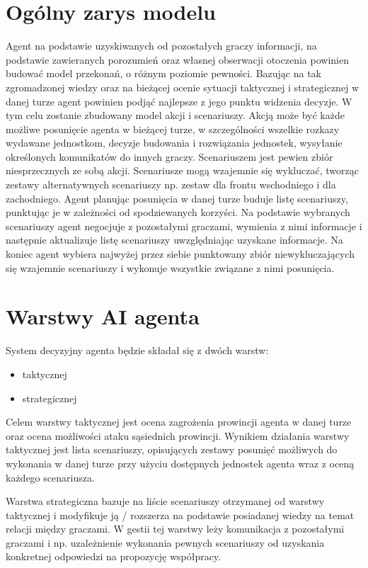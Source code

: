 \section{Ogólny zarys modelu}
Agent na podstawie uzyskiwanych od pozostałych graczy informacji, na podstawie zawieranych porozumień oraz własnej obserwacji otoczenia powinien budować model przekonań, o różnym poziomie pewności. Bazując na tak zgromadzonej wiedzy oraz na bieżącej ocenie sytuacji taktycznej i strategicznej w danej turze agent powinien podjąć najlepsze z jego punktu widzenia decyzje. W tym celu zostanie zbudowany model akcji i scenariuszy. Akcją może być każde możliwe posunięcie agenta w bieżącej turze, w szczególności wszelkie rozkazy wydawane jednostkom, decyzje budowania i rozwiązania jednostek, wysyłanie określonych komunikatów do innych graczy. Scenariuszem jest pewien zbiór niesprzecznych ze sobą akcji. Scenariusze mogą wzajemnie się wykluczać, tworząc zestawy alternatywnych scenariuszy np. zestaw dla frontu wschodniego i dla zachodniego. Agent planując posunięcia w danej turze buduje listę scenariuszy, punktując je w zależności od spodziewanych korzyści. Na podstawie wybranych scenariuszy agent negocjuje z pozostałymi graczami, wymienia z nimi informacje i następnie aktualizuje listę scenariuszy uwzględniając uzyskane informacje. Na koniec agent wybiera najwyżej przez siebie punktowany zbiór niewykluczających się wzajemnie scenariuszy i wykonuje wszystkie związane z nimi posunięcia.

\section{Warstwy AI agenta}
System decyzyjny agenta będzie składał się z dwóch warstw:
\begin{itemize}
	\item{taktycznej}
	\item{strategicznej}
\end{itemize}

Celem warstwy taktycznej jest ocena zagrożenia prowincji agenta w danej turze oraz ocena możliwości ataku sąsiednich prowincji. Wynikiem działania warstwy taktycznej jest lista scenariuszy, opisujących zestawy posunięć możliwych do wykonania w danej turze przy użyciu dostępnych jednostek agenta wraz z oceną każdego scenariusza.

Warstwa strategiczna bazuje na liście scenariuszy otrzymanej od warstwy taktycznej i modyfikuje ją / rozszerza na podstawie posiadanej wiedzy na temat relacji między graczami. W gestii tej warstwy leży komunikacja z pozostałymi graczami i np. uzależnienie wykonania pewnych scenariuszy od uzyskania konkretnej odpowiedzi na propozycję współpracy.


